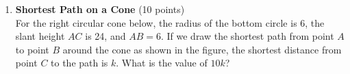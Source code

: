 \begin{enumerate}
  \newpage

  \item \textbf{Shortest Path on a Cone} (10 points)\\
  For the right circular cone below, the radius of the bottom circle is 6, 
  the slant height $AC$ is 24, and $AB=6$. If we draw the shortest path 
  from point $A$ to point $B$ around the cone as shown in the figure, the 
  shortest distance from point $C$ to the path is $k$. What is the value 
  of $10k$?


  \begin{subanswer}
  \end{subanswer}

\end{enumerate}

